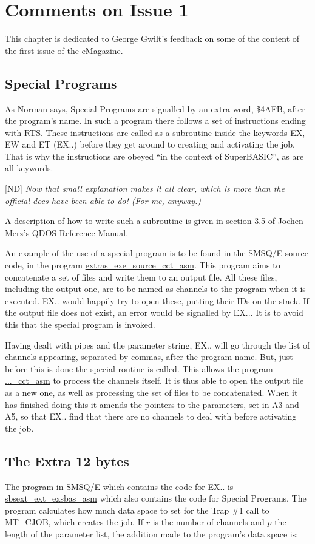 \chapter{Comments on Issue 1}
This chapter is dedicated to George Gwilt's feedback on some of the content of the first issue of the eMagazine.

\section{Special Programs}

As Norman says, Special Programs are signalled by an extra word, \$4AFB, after the program's name. In such a program there follows a set of instructions ending with RTS. These instructions are called as a subroutine inside the keywords EX, EW and ET (EX..) before they get around to creating and activating the job. That is why the instructions are obeyed ``in the context of SuperBASIC'', as are all keywords.

[ND] \emph{Now that small explanation makes it all clear, which is more than the official docs have been able to do! (For me, anyway.)}

A description of how to write such a subroutine is given in section 3.5 of Jochen Merz's QDOS Reference Manual.

An example of the use of a special program is to be found in the SMSQ/E source code, in the program \url{extras_exe_source_cct_asm}. This program aims to concatenate a set of files and write them to an output file. All these files, including the output one, are to be named as channels to the program when it is executed. EX.. would happily try to open these, putting their IDs on the stack. If the output file does not exist, an error would be signalled by EX... It is to avoid this that the special program is invoked.

Having dealt with pipes and the parameter string, EX.. will go through the list of channels appearing, separated by commas, after the program name. But, just before this is done the special routine is called. This allows the program \url{..._cct_asm} to process the channels itself. It is thus able to open the output file as a new one, as well as processing the set of files to be concatenated. When it has finished doing this it amends the pointers to the parameters, set in A3 and A5, so that EX.. find that there are no channels to deal with before activating the job.

\section{The Extra 12 bytes}
The program in SMSQ/E which contains the code for EX.. is \url{sbsext_ext_exsbas_asm} which also contains the code for Special Programs. The program calculates how much data space to set for the
Trap \#1 call to MT\_CJOB, which creates the job. If $r$ is the number of channels and $p$ the length of the parameter list, the addition made to the program's data space is:

